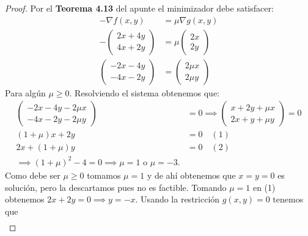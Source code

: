 \documentclass{article}
\begin{document}
\begin{proof}
    Por el \textbf{Teorema 4.13} del apunte el minimizador debe satisfacer: \begin{align*}
        - \nabla f(x, y)  & = \mu \nabla g(x, y) \\
        - \begin{pmatrix}
              2x + 4y \\
              4x + 2y
          \end{pmatrix} & = \mu \begin{pmatrix}
                                    2x \\
                                    2y
                                \end{pmatrix}   \\
        \begin{pmatrix}
            -2x - 4y \\
            -4x - 2y
        \end{pmatrix}   & = \begin{pmatrix}
                                2 \mu x \\
                                2 \mu y
                            \end{pmatrix}
    \end{align*}
    Para algún \( \mu \geq 0 \). Resolviendo el sistema obtenemos que: \begin{align*}
        \begin{pmatrix}
            -2x - 4y - 2 \mu x \\
            -4x - 2y - 2 \mu y
        \end{pmatrix}
                       & = 0 \implies
        \begin{pmatrix}
            x + 2y + \mu x \\
            2x + y + \mu y
        \end{pmatrix}
        = 0                            \\
        (1+\mu) x + 2y & = 0 \quad (1) \\
        2x + (1+\mu) y & = 0 \quad (2) \\
        \implies {(1+\mu)}^2 - 4 = 0 \implies \mu = 1 \text{ o } \mu = -3.
    \end{align*}
    Como debe ser \( \mu \geq 0 \) tomamos \( \mu = 1 \) y de ahí obtenemos que \( x = y = 0 \) es solución, pero la descartamos pues no es factible. Tomando \( \mu = 1 \) en (1) obtenemos \( 2x + 2y = 0 \implies y = -x \).
    Usando la restricción \( g(x, y) = 0 \) tenemos que \begin{align*}

\end{align*}
\end{proof}
\end{document}
